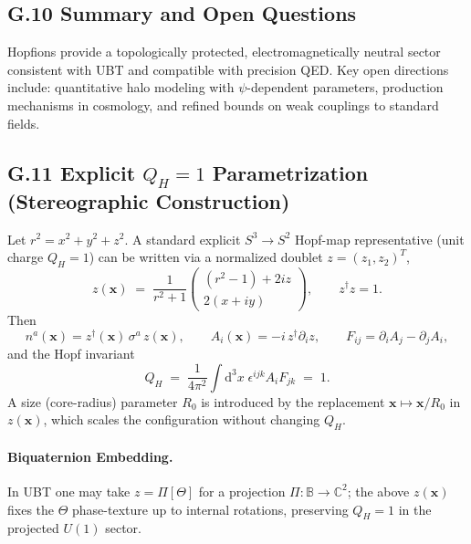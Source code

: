 \documentclass[12pt,a4paper]{article}
\begin{document}
\subsection*{G.10 Summary and Open Questions}
Hopfions provide a topologically protected, electromagnetically neutral sector consistent with UBT and compatible with precision QED. 
Key open directions include: quantitative halo modeling with $\psi$-dependent parameters, production mechanisms in cosmology, and refined bounds on weak couplings to standard fields.

\subsection*{G.11 Explicit $Q_H=1$ Parametrization (Stereographic Construction)}
Let $r^2=x^2+y^2+z^2$. A standard explicit $S^3\!\to\!S^2$ Hopf-map representative (unit charge $Q_H=1$) can be written via a normalized doublet $z=(z_1,z_2)^T$,
\begin{equation}
z(\mathbf{x}) \;=\; \frac{1}{r^2+1}\begin{pmatrix}
(r^2-1) + 2 i z \\[4pt]
2(x+i y)
\end{pmatrix},\qquad z^\dagger z = 1.
\end{equation}
Then
\begin{equation}
n^a(\mathbf{x}) = z^\dagger(\mathbf{x})\,\sigma^a\, z(\mathbf{x}),\qquad
A_i(\mathbf{x})=-i\, z^\dagger \partial_i z,\qquad F_{ij}=\partial_i A_j-\partial_j A_i,
\end{equation}
and the Hopf invariant
\begin{equation}
Q_H \;=\; \frac{1}{4\pi^2}\int\!\mathrm{d}^3x\;\epsilon^{ijk} A_i F_{jk} \;=\; 1.
\end{equation}
A size (core-radius) parameter $R_0$ is introduced by the replacement $\mathbf{x}\mapsto \mathbf{x}/R_0$ in $z(\mathbf{x})$, which scales the configuration without changing $Q_H$.

\paragraph{Biquaternion Embedding.} In UBT one may take $z=\Pi[\Theta]$ for a projection $\Pi:\mathbb{B}\!\to\!\mathbb{C}^2$; the above $z(\mathbf{x})$ fixes the $\Theta$ phase-texture up to internal rotations, preserving $Q_H=1$ in the projected $U(1)$ sector.
\end{document}
